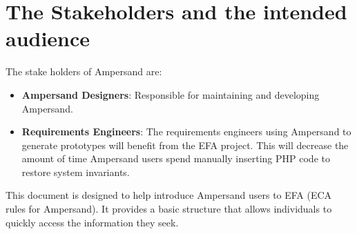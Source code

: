 \section{The Stakeholders and the intended audience}\label{sec:Stakeholders}
The stake holders of Ampersand are:

\begin{itemize}
	\item \textbf{Ampersand Designers}: Responsible for maintaining and developing Ampersand.
	\item \textbf{Requirements Engineers}: The requirements engineers using Ampersand
            to generate prototypes
           will benefit from the EFA
          project.
          This will decrease the amount of time 
Ampersand users spend manually inserting PHP code to restore system invariants. 
\end{itemize}

This document is designed to help introduce  Ampersand users to EFA 
(ECA rules for Ampersand). It provides a basic structure that allows 
individuals to quickly access the information they seek. 
